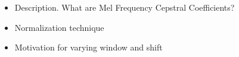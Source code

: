 \begin{itemize}
	\item Description. What are Mel Frequency Cepstral Coefficients?
	\item Normalization technique
	\item Motivation for varying window and shift
\end{itemize}